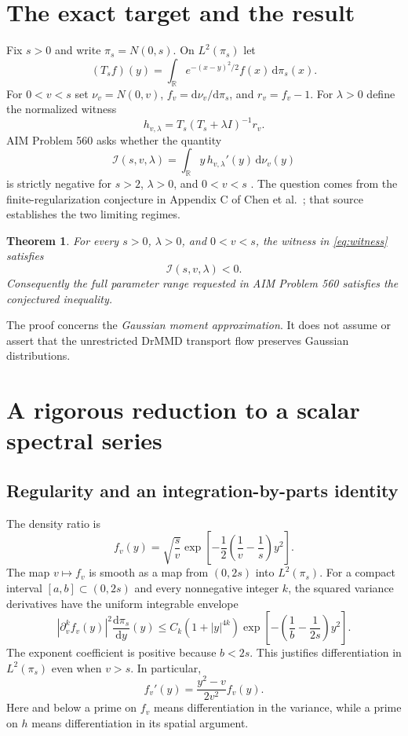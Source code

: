 \documentclass[11pt]{article}
\newtheorem{theorem}{Theorem}[section]
\theoremstyle{remark}
\newcommand{\R}{\mathbb R}
\newcommand{\Ical}{\mathcal I}
\newcommand{\dd}{\,\mathrm d}
\begin{document}
\section{The exact target and the result}
Fix $s>0$ and write $\pi_s=N(0,s)$. On $L^2(\pi_s)$ let
\begin{equation}\label{eq:T}
 (T_s f)(y)=\int_\R e^{-(x-y)^2/2}f(x)\dd\pi_s(x).
\end{equation}
For $0<v<s$ set $\nu_v=N(0,v)$,
$f_v=\mathrm d\nu_v/\mathrm d\pi_s$, and $r_v=f_v-1$.
For $\lambda>0$ define the normalized witness
\begin{equation}\label{eq:witness}
 h_{v,\lambda}=T_s(T_s+\lambda I)^{-1}r_v.
\end{equation}
AIM Problem 560 asks whether the quantity
\begin{equation}\label{eq:target}
 \Ical(s,v,\lambda)=\int_\R y\,h_{v,\lambda}'(y)\dd\nu_v(y)
\end{equation}
is strictly negative for $s>2$, $\lambda>0$, and $0<v<s$ \cite{aim}.
The question comes from the finite-regularization conjecture in Appendix C of Chen et al.\ \cite{chen}; that source establishes the two limiting regimes.

\begin{theorem}\label{thm:main}
For every $s>0$, $\lambda>0$, and $0<v<s$, the witness in \eqref{eq:witness} satisfies
\[
 \boxed{\Ical(s,v,\lambda)<0.}
\]
Consequently the full parameter range requested in AIM Problem 560 satisfies the conjectured inequality.
\end{theorem}
The proof concerns the \emph{Gaussian moment approximation}. It does not assume or assert that the unrestricted DrMMD transport flow preserves Gaussian distributions.

\section{A rigorous reduction to a scalar spectral series}
\subsection{Regularity and an integration-by-parts identity}
The density ratio is
\[
 f_v(y)=\sqrt{\frac{s}{v}}\exp\!\left[-\frac12\left(\frac1v-\frac1s\right)y^2\right].
\]
The map $v\mapsto f_v$ is smooth as a map from $(0,2s)$ into $L^2(\pi_s)$. For a compact interval $[a,b]\subset(0,2s)$ and every nonnegative integer $k$, the squared variance derivatives have the uniform integrable envelope
\[
 |\partial_v^k f_v(y)|^2\frac{\mathrm d\pi_s}{\mathrm dy}(y)
 \le C_k(1+|y|^{4k})\exp\!\left[-\left(\frac1b-\frac1{2s}\right)y^2\right].
\]
The exponent coefficient is positive because $b<2s$. This justifies differentiation in $L^2(\pi_s)$ even when $v>s$.
In particular,
\begin{equation}\label{eq:fvprime}
 f_v'(y)=\frac{y^2-v}{2v^2}f_v(y).
\end{equation}
Here and below a prime on $f_v$ means differentiation in the variance, while a prime on $h$ means differentiation in its spatial argument.
\end{document}
